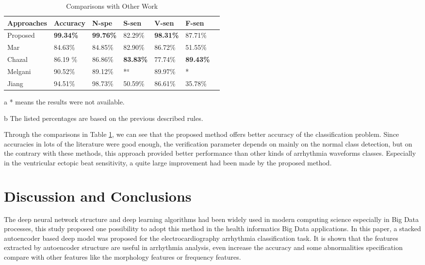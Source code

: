 \documentclass{bmcart}
\begin{document}


\begin{table}[!htbp]
\begin{center}
\begin{threeparttable}
\caption{Comparisons with Other Work}
\label{table5}
\begin{tabular}{lllllll}
\hline

Approaches            &  Accuracy & N-spe & S-sen & V-sen & F-sen \\
\hline
 Proposed             & \textbf{99.34\%}  & \textbf{99.76\%} &  82.29\% & \textbf{98.31\%} & 87.71\% \\
 Mar\cite{mar}        & 84.63\%  & 84.85\% & 82.90\%  & 86.72\% & 51.55\% \\
 Chazal\cite{chaza}   & 86.19 \% & 86.86\% & \textbf{83.83\%}  & 77.74\% & \textbf{89.43\%} \\
 Melgani\cite{melgan} & 90.52\%  & 89.12\% & *$^a$    & 89.97\% & * \\
 Jiang \cite{jiang}   & 94.51\%  & 98.73\% & 50.59\%  & 86.61\% & 35.78\% \\
\hline
\end{tabular}
\begin{tablenotes}
\item [a] * means the results were not available.
\item [b] The listed percentages are based on the previous described rules.
\end{tablenotes}
\end{threeparttable}
\end{center}
\end{table}


Through the comparisons in Table \ref{table5}, we can see that the proposed method offers better accuracy of the classification problem. Since accuracies in lots of the literature were good enough, the verification parameter depends on mainly on the normal class detection, but on the contrary with these methods, this approach provided better performance than other kinds of arrhythmia waveforms classes. Especially in the ventricular ectopic beat sensitivity, a quite large improvement had been made by the proposed method.

\section*{Discussion and Conclusions}
The deep neural network structure and deep learning algorithms had been widely used in modern computing science especially in Big Data processes, this study proposed one possibility to adopt this method in the health informatics Big Data applications. In this paper, a stacked autoencoder based deep model was proposed for the electrocardiography arrhythmia classification task. It is shown that the features extracted by autoencoder structure are useful in arrhythmia analysis, even increase the accuracy and some abnormalities specification compare with other features like the morphology features or frequency features.
\end{document}
